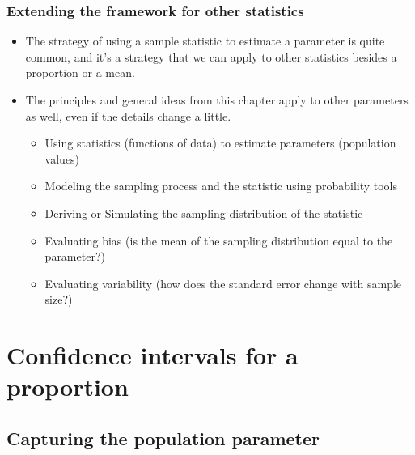 \documentclass[t,compress,mathserif]{beamer}
\begin{document}
\begin{frame}
\frametitle{Extending the framework for other statistics}

\begin{itemize}

\item The strategy of using a sample statistic to estimate a parameter is quite common, and it's a strategy that we can apply to other statistics besides a proportion or a mean.

\item The principles and general ideas from this chapter apply to other parameters as well, even if the details change a little. 
\begin{itemize}
    \item Using statistics (functions of data) to estimate parameters (population values)
    \item Modeling the sampling process and the statistic using probability tools
    \item Deriving or Simulating the sampling distribution of the statistic
    \item Evaluating bias (is the mean of the sampling distribution equal to the parameter?)
    \item Evaluating variability (how does the standard error change with sample size?)
\end{itemize}
\end{itemize}
\end{frame}


\section{Confidence intervals for a proportion}


\subsection{Capturing the population parameter}

\end{document}
